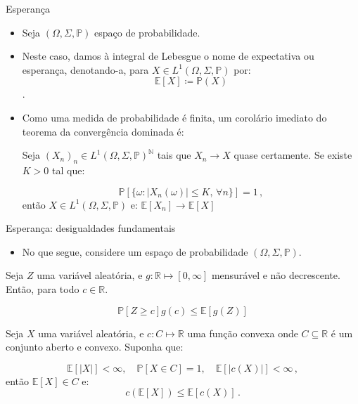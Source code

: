 \documentclass[11pt]{beamer}
\begin{document}
	\begin{frame}{Esperança}
	\begin{itemize}
		\item Seja $(\Omega, \Sigma,\mathbb{P})$ espaço de probabilidade.
		\item Neste caso, damos à integral de Lebesgue o nome de expectativa ou esperança, denotando-a, para $X \in L^1(\Omega,\Sigma, \mathbb{P})$ por:
		$$\mathbb{E}[X] \coloneqq \mathbb{P}(X)$$.
		\item Como uma medida de probabilidade é finita, um corolário imediato do teorema da convergência dominada é:
		\begin{corollary}
			Seja $(X_n)_n \in L^1(\Omega, \Sigma,\mathbb{P})^{\mathbb{N}}$ tais que $X_n \to X$ quase certamente. Se existe $K>0$ tal que:
			
			$$\mathbb{P}[\{\omega:|X_n(\omega)|\leq K,\,  \forall n\}] = 1\, ,$$
			então $X \in L^1(\Omega, \Sigma,\mathbb{P})$ e:
			$\mathbb{E}[X_n] \to \mathbb{E}[X]$
		\end{corollary}
	\end{itemize}
	\end{frame}
	
	\begin{frame}{Esperança: desigualdades fundamentais}
		\begin{itemize}
			\item No que segue, considere um espaço de probabilidade $(\Omega,\Sigma, \mathbb{P})$.
		\end{itemize}
		\begin{lemma}
			Seja $Z$ uma variável aleatória, e $g: \mathbb{R} \mapsto [0,\infty]$ mensurável e não decrescente.  Então, para todo $c \in \mathbb{R}$.
			
			$$\mathbb{P}[Z\geq c] g(c) \leq \mathbb{E}[g(Z)]$$
		\end{lemma}
		
			\begin{lemma}
		Seja $X$ uma variável aleatória, e $c: C \mapsto \mathbb{R}$ uma função convexa onde $C \subseteq \mathbb{R}$ é um conjunto aberto e convexo. Suponha que:
		
		$$\mathbb{E}[|X|]< \infty, \quad \mathbb{P}[X \in C]  = 1, \quad \mathbb{E}[|c(X)|]<\infty\, ,$$
		então $\mathbb{E}[X] \in C$ e:
		$$c(\mathbb{E}[X])\leq \mathbb{E}[c(X)]\, .$$
		\end{lemma}
	\end{frame}
	
\end{document}
